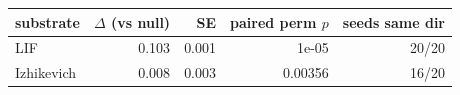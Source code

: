 \begin{tabular}{lrrrr}
\toprule
substrate & $\Delta$ (vs null) & SE & paired perm $p$ & seeds same dir \\
\midrule
LIF & 0.103 & 0.001 & 1e-05 & 20/20 \\
Izhikevich & 0.008 & 0.003 & 0.00356 & 16/20 \\
\bottomrule
\end{tabular}
